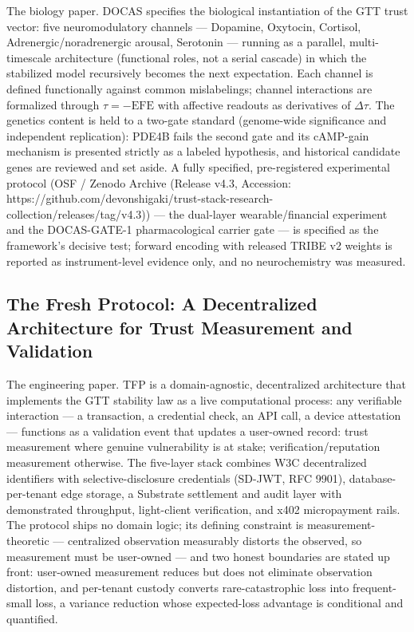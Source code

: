 \documentclass[
]{article}
\begin{document}
The biology paper. DOCAS specifies the biological instantiation of the
GTT trust vector: five neuromodulatory channels --- Dopamine, Oxytocin,
Cortisol, Adrenergic/noradrenergic arousal, Serotonin --- running as a
parallel, multi-timescale architecture (functional roles, not a serial
cascade) in which the stabilized model recursively becomes the next
expectation. Each channel is defined functionally against common
mislabelings; channel interactions are formalized through
\(\tau = -\mathrm{EFE}\) with affective readouts as derivatives of
\(\Delta\tau\). The genetics content is held to a two-gate standard
(genome-wide significance and independent replication): PDE4B fails the
second gate and its cAMP-gain mechanism is presented strictly as a
labeled hypothesis, and historical candidate genes are reviewed and set
aside. A fully specified, pre-registered experimental protocol (OSF /
Zenodo Archive (Release v4.3, Accession:
https://github.com/devonshigaki/trust-stack-research-collection/releases/tag/v4.3))
--- the dual-layer wearable/financial experiment and the DOCAS-GATE-1
pharmacological carrier gate --- is specified as the framework's
decisive test; forward encoding with released TRIBE v2 weights is
reported as instrument-level evidence only, and no neurochemistry was
measured.

\subsection{The Fresh Protocol: A Decentralized Architecture for Trust
Measurement and
Validation}\label{the-fresh-protocol-a-decentralized-architecture-for-trust-measurement-and-validation}

The engineering paper. TFP is a domain-agnostic, decentralized
architecture that implements the GTT stability law as a live
computational process: any verifiable interaction --- a transaction, a
credential check, an API call, a device attestation --- functions as a
validation event that updates a user-owned record: trust measurement
where genuine vulnerability is at stake; verification/reputation
measurement otherwise. The five-layer stack combines W3C decentralized
identifiers with selective-disclosure credentials (SD-JWT, RFC 9901),
database-per-tenant edge storage, a Substrate settlement and audit layer
with demonstrated throughput, light-client verification, and x402
micropayment rails. The protocol ships no domain logic; its defining
constraint is measurement-theoretic --- centralized observation
measurably distorts the observed, so measurement must be user-owned ---
and two honest boundaries are stated up front: user-owned measurement
reduces but does not eliminate observation distortion, and per-tenant
custody converts rare-catastrophic loss into frequent-small loss, a
variance reduction whose expected-loss advantage is conditional and
quantified.
\end{document}
